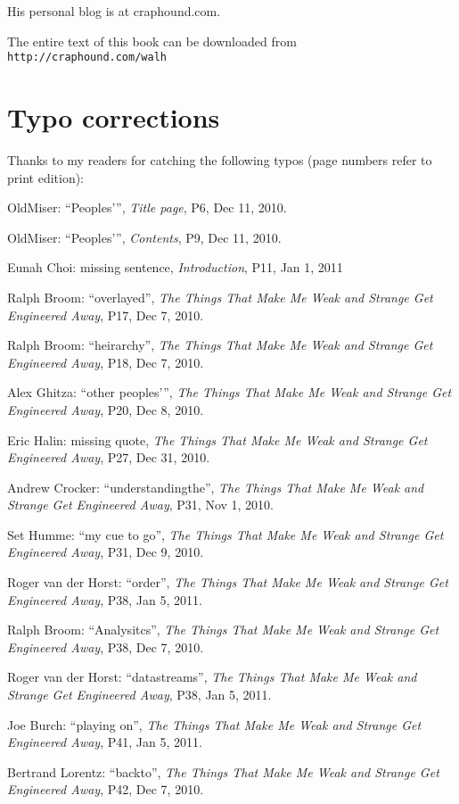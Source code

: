 His personal blog is at craphound.com.

The entire text of this book can be downloaded from\\
\texttt{http://craphound.com/walh}

\section{Typo corrections}

Thanks to my readers for catching the following typos (page numbers 
refer to print edition):

\begin{flushleft}
\setlength{\parskip}{.5\baselineskip}
OldMiser: “Peoples'”, \emph{Title page}, P6, Dec 11, 2010.

OldMiser: “Peoples'”, \emph{Contents}, P9, Dec 11, 2010.

Eunah Choi: missing sentence, \emph{Introduction}, P11, Jan 1, 2011

Ralph Broom: “overlayed”, \emph{The Things That Make Me Weak and 
Strange Get Engineered Away}, P17, Dec 7, 2010.

Ralph Broom: “heirarchy”, \emph{The Things That Make Me Weak and 
Strange Get Engineered Away}, P18, Dec 7, 2010.

Alex Ghitza: “other peoples'”, \emph{The Things That Make Me Weak 
and Strange Get Engineered Away}, P20, Dec 8, 2010.

Eric Halin: missing quote, \emph{The Things That Make Me Weak and 
Strange Get Engineered Away}, P27, Dec 31, 2010.

Andrew Crocker: “understandingthe”, \emph{The Things That Make Me 
Weak and Strange Get Engineered Away}, P31, Nov 1, 2010.

Set Humme: “my cue to go”, \emph{The Things That Make Me Weak and 
Strange Get Engineered Away}, P31, Dec 9, 2010.

Roger van der Horst: “order”, \emph{The Things That Make Me Weak 
and Strange Get Engineered Away}, P38, Jan 5, 2011.

Ralph Broom: “Analysitcs”, \emph{The Things That Make Me Weak and 
Strange Get Engineered Away}, P38, Dec 7, 2010.

Roger van der Horst: “datastreams”, \emph{The Things That Make Me 
Weak and Strange Get Engineered Away}, P38, Jan 5, 2011.

Joe Burch: “playing on”, \emph{The Things That Make Me Weak and 
Strange Get Engineered Away}, P41, Jan 5, 2011.

Bertrand Lorentz: “backto”, \emph{The Things That Make Me Weak and 
Strange Get Engineered Away}, P42, Dec 7, 2010.


\end{flushleft}
